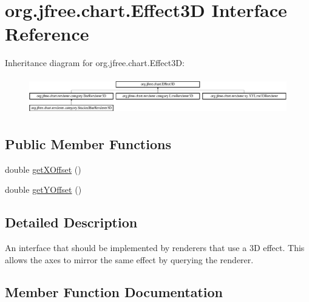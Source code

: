 \hypertarget{interfaceorg_1_1jfree_1_1chart_1_1_effect3_d}{}\section{org.\+jfree.\+chart.\+Effect3D Interface Reference}
\label{interfaceorg_1_1jfree_1_1chart_1_1_effect3_d}
Inheritance diagram for org.\+jfree.\+chart.\+Effect3D\+:\begin{figure}[H]
\begin{center}
\leavevmode
\includegraphics[height=1.609195cm]{interfaceorg_1_1jfree_1_1chart_1_1_effect3_d}
\end{center}
\end{figure}
\subsection*{Public Member Functions}
\begin{DoxyCompactItemize}
\item 
double \mbox{\hyperlink{interfaceorg_1_1jfree_1_1chart_1_1_effect3_d_af4f9829925a6d38170d817afd2486f90}{get\+X\+Offset}} ()
\item 
double \mbox{\hyperlink{interfaceorg_1_1jfree_1_1chart_1_1_effect3_d_abcbf35b295e17395237fa4ed03dd9d8e}{get\+Y\+Offset}} ()
\end{DoxyCompactItemize}


\subsection{Detailed Description}
An interface that should be implemented by renderers that use a 3D effect. This allows the axes to mirror the same effect by querying the renderer. 

\subsection{Member Function Documentation}
\mbox{\label{interfaceorg_1_1jfree_1_1chart_1_1_effect3_d_af4f9829925a6d38170d817afd2486f90}} 
